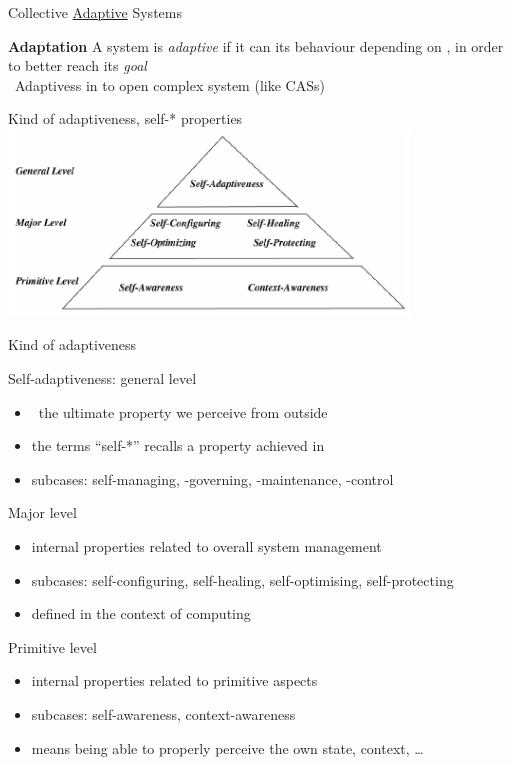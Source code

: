 \documentclass[presentation, 8pt]{beamer}\mode<presentation>{\usetheme{AMSBolognaFC}}
\begin{document}
\begin{frame}{Collective \underline{Adaptive} Systems}
\begin{alertblock}{\textbf{Adaptation}}
A system is \emph{adaptive} if it can  its behaviour
depending on , in order to better reach its \emph{goal}\\
\faArrowRight \, Adaptivess in  to open complex system (like CASs)
\end{alertblock}
\begin{exampleblock}{Kind of adaptiveness, self-* properties}
	\centering
	\includegraphics[width=0.8\textwidth]{img/self-*.png}
\end{exampleblock}
\end{frame}
\begin{frame}{Kind of adaptiveness}
\begin{exampleblock}{Self-adaptiveness: general level}
	\begin{itemize}
		\item {} \faArrowRight \, the ultimate property we perceive from outside
		\item the terms ``self-*'' recalls a property achieved in 
		\item subcases: self-managing, -governing, -maintenance, -control
	\end{itemize}
\end{exampleblock}
\begin{exampleblock}{Major level}
	\begin{itemize}
		\item internal properties related to overall system management
		\item subcases: self-configuring, self-healing, self-optimising, self-protecting
		\item defined in the context of  computing
	\end{itemize}
\end{exampleblock}
\begin{exampleblock}{Primitive level}
	\begin{itemize}
		\item internal properties related to primitive aspects
		\item subcases: self-awareness, context-awareness
		\item means being able to properly perceive the own state, context, \dots
	\end{itemize}
\end{exampleblock}
\end{frame}
\end{document}
